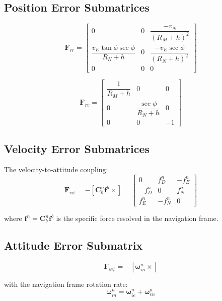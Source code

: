 \documentclass[11pt,a4paper]{article}
\newcommand{\mat}[1]{\mathbf{#1}}
\newcommand{\vect}[1]{\boldsymbol{#1}}
\newcommand{\skewmat}[1]{\left[#1 \times\right]}
\begin{document}
\subsection{Position Error Submatrices}

\begin{equation}
    \mat{F}_{rr} = \begin{bmatrix}
        0 & 0 & \dfrac{-v_N}{(R_M+h)^2} \\[1em]
        \dfrac{v_E \tan\phi \sec\phi}{R_N+h} & 0 & \dfrac{-v_E \sec\phi}{(R_N+h)^2} \\[1em]
        0 & 0 & 0
    \end{bmatrix}
\end{equation}

\begin{equation}
    \mat{F}_{rv} = \begin{bmatrix}
        \dfrac{1}{R_M+h} & 0 & 0 \\[1em]
        0 & \dfrac{\sec\phi}{R_N+h} & 0 \\[1em]
        0 & 0 & -1
    \end{bmatrix}
\end{equation}

\subsection{Velocity Error Submatrices}

The velocity-to-attitude coupling:
\begin{equation}
    \mat{F}_{v\psi} = -\skewmat{\mat{C}_b^n \mat{f}^b} = \begin{bmatrix}
        0 & f_D^n & -f_E^n \\
        -f_D^n & 0 & f_N^n \\
        f_E^n & -f_N^n & 0
    \end{bmatrix}
\end{equation}

where $\mat{f}^n = \mat{C}_b^n \mat{f}^b$ is the specific force resolved in the navigation frame.

\subsection{Attitude Error Submatrix}

\begin{equation}
    \mat{F}_{\psi\psi} = -\skewmat{\vect{\omega}_{in}^n}
\end{equation}

with the navigation frame rotation rate:
\begin{equation}
    \vect{\omega}_{in}^n = \vect{\omega}_{ie}^n + \vect{\omega}_{en}^n
\end{equation}
\end{document}
